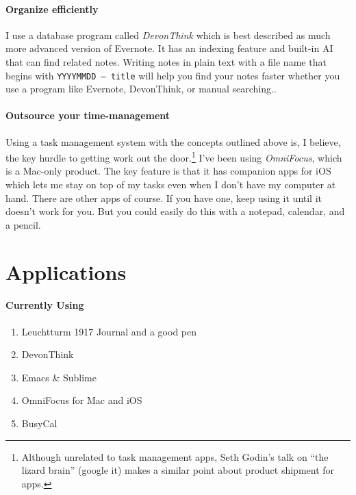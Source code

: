 \documentclass{tufte-handout}
\begin{document}
\paragraph{Organize efficiently}

I use a database program called \textit{DevonThink} which is best
described as much more advanced version of Evernote. It has an
indexing feature and built-in AI that can find related notes. Writing
notes in plain text with a file name that begins with \texttt{YYYYMMDD
  -- title} will help you find your notes faster whether you use a
program like Evernote, DevonThink, or manual
searching..

\paragraph{Outsource your time-management}

Using a task management system with the concepts outlined above is, I
believe, the key hurdle to getting work out the
door.\footnote{Although unrelated to task management apps, Seth
  Godin's talk on ``the lizard brain'' (google it) makes a similar
  point about product shipment for apps.} I've been using
\textit{OmniFocus}, which is a Mac-only product. The key feature is
that it has companion apps for iOS which lets me stay on top of my
tasks even when I don't have my computer at hand. There are other
apps of course. If you have one, keep using it until it doesn't work
for you. But you could easily do this with a notepad, calendar, and a
pencil.  

\section{Applications} %
\label{sec:applications}

\paragraph{Currently Using} %
\label{par:currently_using}
\begin{enumerate}
  \item[] Leuchtturm 1917 Journal and a good pen
  \item[] DevonThink
  \item[] Emacs \& Sublime
  \item[] OmniFocus for Mac and iOS
  \item[] BusyCal
\end{enumerate}
\end{document}
